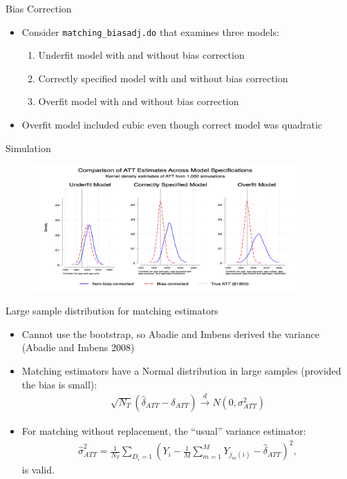 \documentclass{beamer}
\begin{document}
\begin{frame}{Bias Correction}

\begin{itemize}

\item Consider \texttt{matching_biasadj.do} that examines three models:
	\begin{enumerate}
	\item Underfit model with and without bias correction
	\item Correctly specified model with and without bias correction
	\item Overfit model with and without bias correction
	\end{enumerate}
\item Overfit model included cubic even though correct model was quadratic
\end{itemize}

\end{frame}


\begin{frame}{Simulation}
\begin{figure}[htbp]
    \centering
    \includegraphics[width=0.9\textwidth, height=0.65\textheight]{./lecture_includes/att_estimates_comparison.png}
    \label{fig:nnmatch_estimates1}
\end{figure}

\end{frame}


\begin{frame}{Large sample distribution for matching estimators}
	
	\begin{itemize}
	\item Cannot use the bootstrap, so Abadie and Imbens derived the variance (Abadie and Imbens 2008)
	\item Matching estimators have a Normal distribution in large samples (provided the bias is small):
		\begin{eqnarray*}
		\sqrt{N_T} (\widehat{\delta}_{ATT} - \delta_{ATT}) \xrightarrow{d} N(0,\sigma^2_{ATT})
		\end{eqnarray*}
	\item For matching without replacement, the ``usual'' variance estimator:
		\begin{eqnarray*}
		\widehat{\sigma}^2_{ATT} = \frac{1}{N_T} \sum_{D_i=1} \left( Y_i - \frac{1}{M} \sum_{m=1}^M Y_{j_m(i)} - \widehat{\delta}_{ATT} \right)^2,
		\end{eqnarray*}is valid.
	\end{itemize}
\end{frame}
\end{document}
